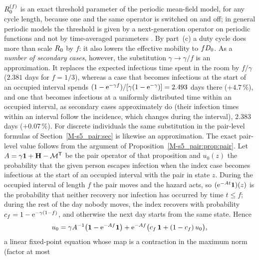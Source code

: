 \begin{remark}\label{s7_interventions:rem:duty}
  $R_0^{(f)}$ is an exact threshold parameter of the periodic mean-field model, for any cycle length, because
  one and the same operator is switched on and off; in general periodic models the threshold is given by a
  next-generation operator on periodic functions and not by time-averaged parameters
  \citep{bacaer2006epidemic,wang2008threshold}. By part~(c) a duty cycle does more than scale $R_0$ by $f$: it
  also lowers the effective mobility to $fD_0$.
  As a \emph{number of secondary cases}, however, the substitution $\gamma\to\gamma/f$ is an approximation. It
  replaces the expected infectious time spent in the room by $f/\gamma$ ($2.381$ days for $f=1/3$), whereas a
  case that becomes infectious at the start of an occupied interval spends
  $(1-\mathrm{e}^{-\gamma f})/[\gamma(1-\mathrm{e}^{-\gamma})]=2.493$ days there ($+4.7\,\%$), and one that becomes infectious
  at a uniformly distributed time within an occupied interval, as secondary cases approximately do (their
  infection times within an interval follow the incidence, which changes during the interval), $2.383$ days
  ($+0.07\,\%$).
  For discrete individuals the same substitution in the pair-level formulas of Section~\ref{M-s5_pair:sec} is
  likewise an approximation. The exact pair-level value follows from the argument of
  Proposition~\ref{M-s5_pair:prop:pair}. Let $A=\gamma\mathbf{1}+\mathbf{H}-\mathcal{M}^{\mathsf{T}}$ be the pair operator of
  that proposition and $u_0(z)$ the probability that the given person escapes infection when the index case
  becomes infectious at the start of an occupied interval with the pair in state $z$. During the occupied
  interval of length $f$ the pair moves and the hazard acts, so $(\mathrm{e}^{-At}\boldsymbol{1})(z)$ is the probability that
  neither recovery nor infection has occurred by time $t\le f$; during the rest of the day nobody moves, the
  index recovers with probability $c_f=1-\mathrm{e}^{-\gamma(1-f)}$, and otherwise the next day starts from the same
  state. Hence
  \begin{equation}\label{s7_interventions:eq:dutyexact}
    u_0=\gamma A^{-1}\bigl(\boldsymbol{1}-\mathrm{e}^{-Af}\boldsymbol{1}\bigr)+\mathrm{e}^{-Af}\bigl(c_f\,\boldsymbol{1}+(1-c_f)\,u_0\bigr),
  \end{equation}
  a linear fixed-point equation whose map is a contraction in the maximum norm (factor at most

\end{remark}
